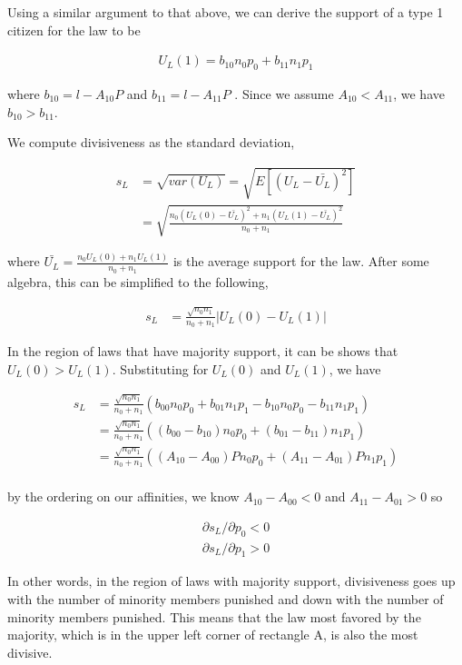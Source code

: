 Using a similar argument to that above, we can derive the support of a type 1 citizen for the law to be

\begin{align}
U_L(1) =  b_{10} n_0p_0 + b_{11}n_1p_1
\end{align}

where $b_{10} = l -   A_{10}P$ and $b_{11} = l -  A_{11}P $ .  Since we assume $A_{10} < A_{11}$, we have $b_{10} > b_{11}$.

We compute divisiveness as the standard deviation,

\begin{align}
s_L &= \sqrt{var(U_L)}  =  \sqrt{E\left[ \left(U_L - \bar{U_L} \right)^2 \right] }  \\
&= \sqrt{ \frac{ n_0\left(U_L(0) - \bar{U_L}\right)^2 + n_1\left(U_L(1) - \bar{U_L} \right)^2 }{n_0+n_1}  }
\end{align}

where $\bar{U_L} = \frac{n_0 U_L(0) + n_1U_L(1) }{n_0 + n_1}$ is the average support for the law.  After some algebra, this can be simplified to the following,

\begin{align}
s_L &= \frac{\sqrt{n_0n_1}}{n_0 + n_1} \left| U_L(0) - U_L(1) \right|
\end{align}

In the region of laws that have majority support, it can be shows that $U_L(0) > U_L(1)$. Substituting for $U_L(0)$ and $U_L(1)$, we have

\begin{align}
s_L &= \frac{\sqrt{n_0n_1}}{n_0 + n_1} \left(  b_{00}n_0p_0 + b_{01} n_1p_1 - b_{10} n_0p_0 - b_{11}n_1p_1 \right) \\
&= \frac{\sqrt{n_0n_1}}{n_0 + n_1} \left(  ( b_{00} - b_{10} )n_0p_0 + ( b_{01} - b_{11})n_1p_1 \right) \\
&= \frac{\sqrt{n_0n_1}}{n_0 + n_1} \left(  ( A_{10} - A_{00} )P n_0p_0 + ( A_{11} - A_{01})P n_1p_1 \right) \\
\end{align}

by the ordering on our affinities, we know $A_{10} - A_{00}  < 0$ and $A_{11} - A_{01} > 0$ so

\begin{align}
\partial s_L / \partial p_0 <0 \\
\partial s_L / \partial p_1 >0
\end{align}

In other words, in the region of laws with majority support, divisiveness goes up with the number of minority members punished and down with the number of minority members punished.  This means that the law most favored by the majority, which is in the upper left corner of rectangle A, is also the most divisive.

